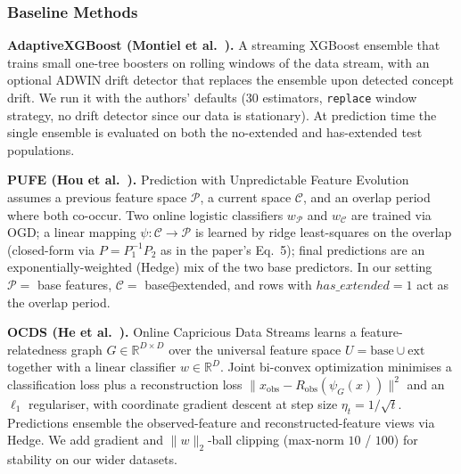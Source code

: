 \documentclass[sigconf]{acmart}
\begin{document}
\begin{itemize}
\subsubsection{Baseline Methods}

\textbf{AdaptiveXGBoost (Montiel et al.~\cite{montiel2020axgb}).} A streaming XGBoost ensemble that trains small one-tree boosters on rolling windows of the data stream, with an optional ADWIN drift detector that replaces the ensemble upon detected concept drift. We run it with the authors' defaults (30 estimators, \texttt{replace} window strategy, no drift detector since our data is stationary). At prediction time the single ensemble is evaluated on both the no-extended and has-extended test populations.

\textbf{PUFE (Hou et al.~\cite{he2021pufe}).} Prediction with Unpredictable Feature Evolution assumes a previous feature space $\mathcal{P}$, a current space $\mathcal{C}$, and an overlap period where both co-occur. Two online logistic classifiers $w_\mathcal{P}$ and $w_\mathcal{C}$ are trained via OGD; a linear mapping $\psi:\mathcal{C}\!\to\!\mathcal{P}$ is learned by ridge least-squares on the overlap (closed-form via $P = P_1^{-1}P_2$ as in the paper's Eq.~5); final predictions are an exponentially-weighted (Hedge) mix of the two base predictors. In our setting $\mathcal{P}=$ base features, $\mathcal{C}=$ base$\oplus$extended, and rows with $has\_extended=1$ act as the overlap period.

\textbf{OCDS (He et al.~\cite{he2019ocds}).} Online Capricious Data Streams learns a feature-relatedness graph $G\!\in\!\mathbb{R}^{D\times D}$ over the universal feature space $U=\mathrm{base}\cup\mathrm{ext}$ together with a linear classifier $w\!\in\!\mathbb{R}^D$. Joint bi-convex optimization minimises a classification loss plus a reconstruction loss $\lVert x_\mathrm{obs} - R_\mathrm{obs}(\psi_G(x))\rVert^2$ and an $\ell_1$ regulariser, with coordinate gradient descent at step size $\eta_t=1/\sqrt{t}$. Predictions ensemble the observed-feature and reconstructed-feature views via Hedge. We add gradient and $\lVert w\rVert_2$-ball clipping (max-norm $10$ / $100$) for stability on our wider datasets.


\end{itemize}
\end{document}
